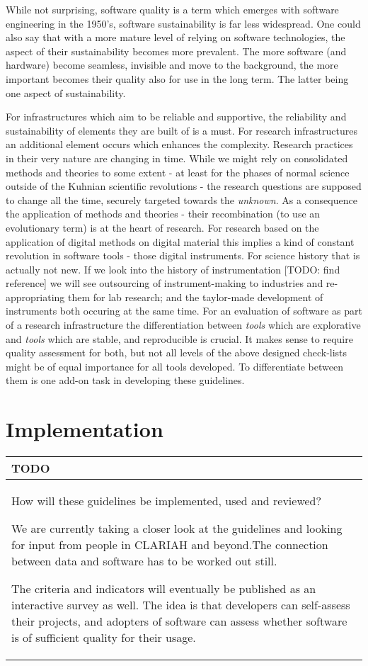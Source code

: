 \documentclass[a4paper,11pt]{article}
\newenvironment{TODO}{
\begin{center}
    \begin{tabular}[h!]{|p{0.8\textwidth}|}
    \hline
    {\bf TODO}\\\hline}
{   \\\hline
    \end{tabular}
\end{center}}
\begin{document}
While not surprising, software quality is a term which emerges with software
engineering in the 1950's, software sustainability is far less widespread. One
could also say that with a more mature level of relying on software
technologies, the aspect of their sustainability becomes more prevalent. The
more software (and hardware) become seamless, invisible and move to the
background, the more important becomes their quality also for use in the long
term. The latter being one aspect of sustainability.

For infrastructures which aim to be reliable and supportive, the
reliability and sustainability of elements they are built of is a must.
For research infrastructures an additional element occurs which enhances the
complexity. Research practices in their very nature are changing in time. While
we might rely on consolidated methods and theories to some extent - at least
for the phases of normal science outside of the Kuhnian scientific revolutions
- the research questions are supposed to change all the time, securely targeted
towards the \textit{unknown}. As a consequence the application of methods and
theories - their recombination (to use an evolutionary term) is at the heart of
research. For research based on the application of digital methods on digital
material this implies a kind of constant revolution in software tools - those
digital instruments.  For science history that is actually not new. If we look
into the history of instrumentation [TODO: find reference] we will see outsourcing of %
instrument-making to industries and re-appropriating them for lab research; and
the taylor-made development of instruments both occuring at the same time.  For an
evaluation of software as part of a research infrastructure the
differentiation between \textit{tools} which are explorative and \textit{tools}
which are stable, and reproducible is crucial. It makes sense to require
quality assessment for both, but not all levels of the above designed
check-lists might be of equal importance for all tools developed. To
differentiate between them is one add-on task in developing these guidelines. 

\section{Implementation}

\begin{TODO}
How will these guidelines be implemented, used and reviewed?

We are currently taking a closer look at the guidelines and looking for input
from people in CLARIAH and beyond.The connection between data and software has
to be worked out still.

The criteria and indicators will eventually be published as an interactive
survey as well. The idea is that developers can self-assess their projects, and
adopters of software can assess whether software is of sufficient quality for
their usage.
\end{TODO}
\end{document}
